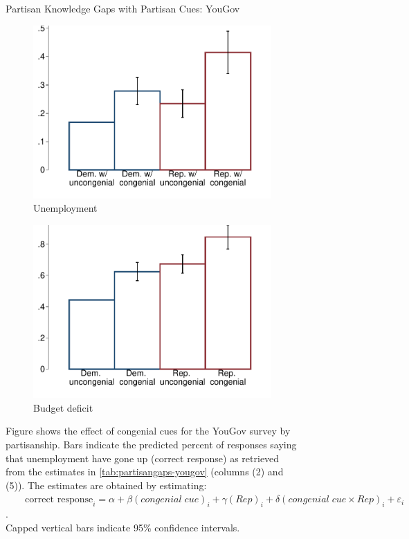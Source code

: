 \begin{figure}[ht]
	\caption{Partisan Knowledge Gaps with Partisan Cues: YouGov}
	\centering
	\begin{subfigure}{.495\textwidth}\centering
		\includegraphics[width=\textwidth]{../figs/yougov-unemp-congenialcue-partisan.pdf}
		\caption{Unemployment}
	\end{subfigure}
	\hfil
	\begin{subfigure}{.495\textwidth}\centering
		\includegraphics[width=\textwidth]{../figs/yougov-deficit-congenialcue-partisan.pdf}
		\caption{Budget deficit}
	\end{subfigure}
	\caption*{\footnotesize Figure shows the effect of congenial cues for the YouGov survey by partisanship. Bars indicate the predicted percent of responses saying that unemployment have gone up (correct response) as retrieved from the estimates in \cref{tab:partisangaps-yougov} (columns (2) and (5)).  The estimates are obtained by estimating:\\
		
		$\qquad\text{correct response}_{i} = \alpha + \beta (congenial \; cue)_i + \gamma (Rep)_i + \delta (congenial\; cue \times Rep)_i + \varepsilon_{i}$.\\
		
		Capped vertical bars indicate 95\% confidence intervals.
	}
	\label{fig:yougov-reg-by-partisanship}
\end{figure}

